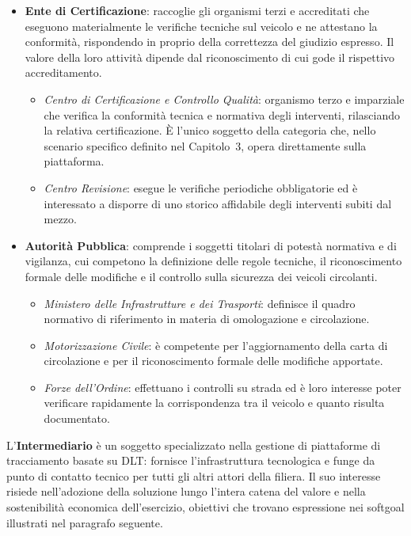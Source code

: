 \begin{itemize}
    \item \textbf{Ente di Certificazione}: raccoglie gli organismi terzi e accreditati che eseguono materialmente le verifiche tecniche sul veicolo e ne attestano la conformit\`a, rispondendo in proprio della correttezza del giudizio espresso. Il valore della loro attivit\`a dipende dal riconoscimento di cui gode il rispettivo accreditamento.
    \begin{itemize}
        \item \textit{Centro di Certificazione e Controllo Qualit\`a}: organismo terzo e imparziale che verifica la conformit\`a tecnica e normativa degli interventi, rilasciando la relativa certificazione. \`E l'unico soggetto della categoria che, nello scenario specifico definito nel Capitolo~3, opera direttamente sulla piattaforma.
        \item \textit{Centro Revisione}: esegue le verifiche periodiche obbligatorie ed \`e interessato a disporre di uno storico affidabile degli interventi subiti dal mezzo.
    \end{itemize}

    \item \textbf{Autorit\`a Pubblica}: comprende i soggetti titolari di potest\`a normativa e di vigilanza, cui competono la definizione delle regole tecniche, il riconoscimento formale delle modifiche e il controllo sulla sicurezza dei veicoli circolanti.
    \begin{itemize}
        \item \textit{Ministero delle Infrastrutture e dei Trasporti}: definisce il quadro normativo di riferimento in materia di omologazione e circolazione.
        \item \textit{Motorizzazione Civile}: \`e competente per l'aggiornamento della carta di circolazione e per il riconoscimento formale delle modifiche apportate.
        \item \textit{Forze dell'Ordine}: effettuano i controlli su strada ed \`e loro interesse poter verificare rapidamente la corrispondenza tra il veicolo e quanto risulta documentato.
    \end{itemize}
\end{itemize}

L'\textbf{Intermediario} \`e un soggetto specializzato nella gestione di piattaforme di tracciamento basate su DLT: fornisce l'infrastruttura tecnologica e funge da punto di contatto tecnico per tutti gli altri attori della filiera. Il suo interesse risiede nell'adozione della soluzione lungo l'intera catena del valore e nella sostenibilit\`a economica dell'esercizio, obiettivi che trovano espressione nei softgoal illustrati nel paragrafo seguente.

